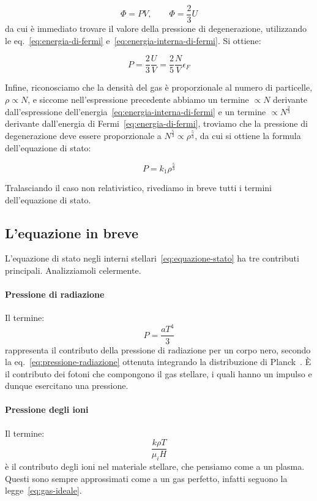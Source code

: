  \[
    \Phi = PV, \qquad \Phi = \frac{2}{3} U
 \]
da cui è immediato trovare il valore della pressione di degenerazione, utilizzando le eq.~\eqref{eq:energia-di-fermi} e~\eqref{eq:energia-interna-di-fermi}. Si ottiene:

\begin{equation}\label{eq:pressione-degenerazione-kennett}
    P = \frac{2}{3} \frac{U}{V} = \frac{2}{5} \frac{N}{V} \epsilon_F
\end{equation}

Infine, riconosciamo che la densità del gas è proporzionale al numero di particelle, $\rho \propto N$, e siccome nell'espressione precedente abbiamo un termine $\propto N$ derivante dall'espressione dell'energia~\eqref{eq:energia-interna-di-fermi} e un termine $\propto N^\frac{2}{3}$ derivante dall'energia di Fermi~\eqref{eq:energia-di-fermi}, troviamo che la pressione di degenerazione deve essere proporzionale a $N^\frac{5}{3} \propto \rho^\frac{5}{3}$, da cui si ottiene la formula dell'equazione di stato:

\[
  P = k_1 \rho^\frac{5}{3}  
\]

Tralasciando il caso non relativistico, rivediamo in breve tutti i termini dell'equazione di stato.

\subsection{L'equazione in breve}
L'equazione di stato negli interni stellari~\eqref{eq:equazione-stato} ha tre contributi principali. Analizziamoli celermente.

\paragraph{Pressione di radiazione}
Il termine:
\[
P = \dfrac{aT^4}{3}
\]
rappresenta il contributo della pressione di radiazione per un corpo nero, secondo la eq.~\eqref{eq:pressione-radiazione} ottenuta integrando la distribuzione di Planck~. È il contributo dei fotoni che compongono il gas stellare, i quali hanno un impulso e dunque esercitano una pressione.

\paragraph{Pressione degli ioni}
Il termine:
\[
\dfrac{k \rho T}{\mu_i H}
\]
è il contributo degli ioni nel materiale stellare, che pensiamo come a un plasma. Questi sono sempre approssimati come a un gas perfetto, infatti seguono la legge~\eqref{eq:gas-ideale}.

